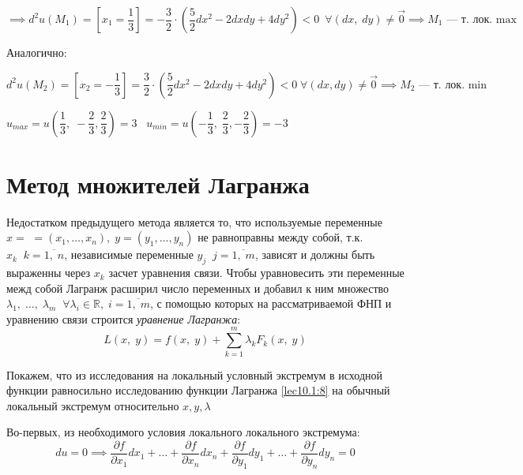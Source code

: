 \documentclass[../../main.tex]{subfiles}
\begin{document}
	\[\implies d^2u\left(M_1\right) = \left[x_1 = \dfrac{1}{3}\right] = 
	-\dfrac{3}{2}\cdot(\dfrac{5}{2}dx^2 - 2dxdy + 4dy^2) < 0\ \; 
	\forall \left(dx, \; dy\right) \neq \vec{0} \implies 
	M_1 \text{~--- т. лок. max}\]
	
	Аналогично:
	
	\[d^2u \left(M_2\right) = \left[x_2 = -\dfrac{1}{3} \right] = 
	\dfrac{3}{2} \cdot \left( \dfrac{5}{2} dx^2 - 2dxdy + 4dy^2\right) < 0 
	\; \forall \left(dx, dy\right) \neq \vec{0} \implies M_2 
	\text{~--- т. лок. min}\]
	
	$u_{max} = u\left(\dfrac{1}{3}, \; -\dfrac{2}{3}, 
	\dfrac{2}{3}\right) = 3 \;\;\; 
	u_{min} = u\left(-\dfrac{1}{3}, \; 
	\dfrac{2}{3}, -\dfrac{2}{3}\right) = -3$ 
	
	\section{Метод множителей Лагранжа} 
	
	Недостатком предыдущего метода является то, что используемые переменные 
	$x = $ $=\left(x_1, \ldots, x_n\right), \; y = \left(y_1,\ldots, y_n\right)$
	не равноправны между собой, т.к. $x_k \;\; k = \overline{1,\; n}$, 
	независимые переменные $y_j \;\; j = \overline{1,\; m}$, зависят и 
	должны быть выраженны через $x_k$ засчет уравнения связи. 
	Чтобы уравновесить эти переменные межд собой Лагранж расширил 
	число переменных и добавил к ним множество 
	$\lambda_1,\; \ldots,\; \lambda_m \;\; \forall 
	\lambda_i \in \mathbb{R}, \; i = \overline{1,\; m}$, 
	с помощью которых на рассматриваемой ФНП и уравнению 
	связи строится \emph{уравнение Лагранжа}:
	\begin{equation}
	L\left(x, \; y\right) = f\left(x, \; y\right) + \sum\limits_{k = 1}^m 
	\lambda_k F_k\left(x, \; y\right) \label{lec10.1:8}
	\end{equation}
	
	
	Покажем, что из исследования на локальный условный экстремум в исходной 
	функции равносильно исследованию функции Лагранжа 
	\eqref{lec10.1:8} на обычный локальный экстремум относительно $x, y,\lambda$
	
	Во-первых, из необходимого условия локального локального экстремума:
	\begin{equation}
	du = 0 \implies \dfrac{\partial f}{\partial x_1} dx_1 + \ldots + 
	\dfrac{\partial f}{\partial x_n} dx_n + \dfrac{\partial f}{\partial y_1}dy_1
	 + \ldots + \dfrac{\partial f}{\partial y_n} dy_n = 0 \label{lec10.1:9}
	\end{equation}
	
\end{document}
